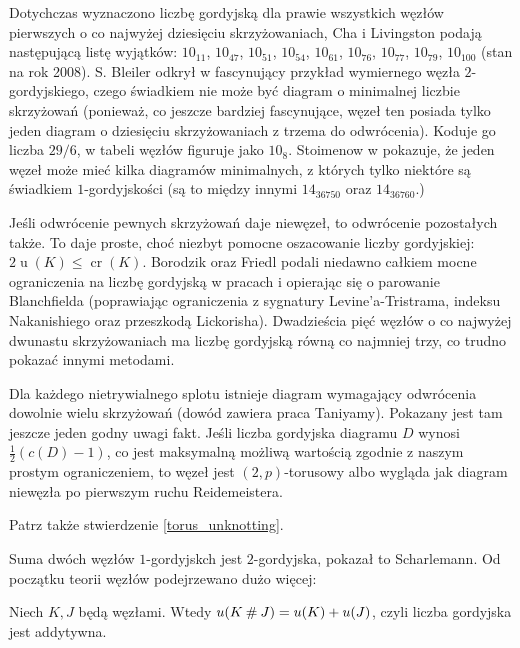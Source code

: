 Dotychczas wyznaczono liczbę gordyjską dla prawie wszystkich węzłów pierwszych o co najwyżej dziesięciu skrzyżowaniach,
Cha i Livingston podają następującą listę wyjątków:
$10_{11}$, $10_{47}$, $10_{51}$, $10_{54}$, $10_{61}$, $10_{76}$, $10_{77}$, $10_{79}$, $10_{100}$ (stan na rok 2008).
S. Bleiler odkrył w \cite{bleiler84} fascynujący przykład wymiernego węzła $2$-gordyjskiego,
czego świadkiem nie może być diagram o minimalnej liczbie skrzyżowań
(ponieważ, co jeszcze bardziej fascynujące, węzeł ten posiada tylko jeden diagram o dziesięciu skrzyżowaniach z trzema do odwrócenia).
Koduje go liczba $29/6$, w tabeli węzłów figuruje jako $10_8$.
Stoimenow w \cite{stoimenow01} pokazuje, że jeden węzeł może mieć kilka diagramów minimalnych,
z których tylko niektóre są świadkiem $1$-gordyjskości (są to między innymi $14_{36750}$ oraz $14_{36760}$.)

Jeśli odwrócenie pewnych skrzyżowań daje niewęzeł, to odwrócenie pozostałych także.
To daje proste, choć niezbyt pomocne oszacowanie liczby gordyjskiej: $2 \operatorname{u} (K) \le \operatorname{cr} (K)$.
Borodzik oraz Friedl podali niedawno całkiem mocne ograniczenia na liczbę gordyjską w pracach \cite{borodzik14} i \cite{borodzik15} opierając się o parowanie Blanchfielda
(poprawiając ograniczenia z sygnatury Levine'a-Tristrama, indeksu Nakanishiego oraz przeszkodą Lickorisha).
Dwadzieścia pięć węzłów o co najwyżej dwunastu skrzyżowaniach ma liczbę gordyjską równą co najmniej trzy, co trudno pokazać innymi metodami.

Dla każdego nietrywialnego splotu istnieje diagram wymagający odwrócenia  dowolnie wielu skrzyżowań (dowód zawiera praca \cite{taniyama09} Taniyamy).
Pokazany jest tam jeszcze jeden godny uwagi fakt.
Jeśli liczba gordyjska diagramu $D$ wynosi $\frac 12 (c(D) - 1)$,
co jest maksymalną możliwą wartością zgodnie z naszym prostym ograniczeniem,
to węzeł jest $(2,p)$-torusowy albo wygląda jak diagram niewęzła po pierwszym ruchu Reidemeistera.

Patrz także stwierdzenie \ref{torus_unknotting}.

Suma dwóch węzłów $1$-gordyjskch jest $2$-gordyjska, pokazał to Scharlemann.
Od początku teorii węzłów podejrzewano dużo więcej:

\begin{conjecture}
    Niech $K, J$ będą węzłami.
    Wtedy $u(K \mathbin{\#} J) = u(K) + u(J)$, czyli liczba gordyjska jest addytywna.
\end{conjecture}

